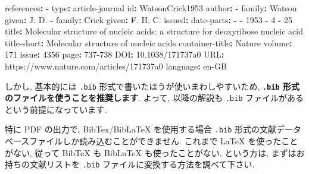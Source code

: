 \documentclass[
]{bxjsarticle}
\newenvironment{Shaded}{\begin{snugshade}}{\end{snugshade}}
\newcommand{\AttributeTok}[1]{\textcolor[rgb]{0.77,0.63,0.00}{#1}}
\newcommand{\DecValTok}[1]{\textcolor[rgb]{0.00,0.00,0.81}{#1}}
\newcommand{\FunctionTok}[1]{\textcolor[rgb]{0.00,0.00,0.00}{#1}}
\newcommand{\KeywordTok}[1]{\textcolor[rgb]{0.13,0.29,0.53}{\textbf{#1}}}
\newcommand{\StringTok}[1]{\textcolor[rgb]{0.31,0.60,0.02}{#1}}
\begin{document}
\begin{Shaded}
\begin{Highlighting}[numbers=left,,]
\FunctionTok{references}\KeywordTok{:}
\AttributeTok{  }\KeywordTok{{-}}\AttributeTok{ }\FunctionTok{type}\KeywordTok{:}\AttributeTok{ article{-}journal}
\AttributeTok{    }\FunctionTok{id}\KeywordTok{:}\AttributeTok{ WatsonCrick1953}
\AttributeTok{    }\FunctionTok{author}\KeywordTok{:}
\AttributeTok{    }\KeywordTok{{-}}\AttributeTok{ }\FunctionTok{family}\KeywordTok{:}\AttributeTok{ Watson}
\AttributeTok{      }\FunctionTok{given}\KeywordTok{:}\AttributeTok{ J. D.}
\AttributeTok{    }\KeywordTok{{-}}\AttributeTok{ }\FunctionTok{family}\KeywordTok{:}\AttributeTok{ Crick}
\AttributeTok{      }\FunctionTok{given}\KeywordTok{:}\AttributeTok{ F. H. C.}
\AttributeTok{    }\FunctionTok{issued}\KeywordTok{:}
\AttributeTok{      }\FunctionTok{date{-}parts}\KeywordTok{:}
\AttributeTok{      }\KeywordTok{{-}}\AttributeTok{ }\KeywordTok{{-}}\AttributeTok{ }\DecValTok{1953}
\AttributeTok{        }\KeywordTok{{-}}\AttributeTok{ }\DecValTok{4}
\AttributeTok{        }\KeywordTok{{-}}\AttributeTok{ }\DecValTok{25}
\AttributeTok{    }\FunctionTok{title}\KeywordTok{:}\AttributeTok{ }\StringTok{\textquotesingle{}Molecular structure of nucleic acids: a structure for}
\StringTok{      deoxyribose nucleic acid\textquotesingle{}}
\AttributeTok{    }\FunctionTok{title{-}short}\KeywordTok{:}\AttributeTok{ Molecular structure of nucleic acids}
\AttributeTok{    }\FunctionTok{container{-}title}\KeywordTok{:}\AttributeTok{ Nature}
\AttributeTok{    }\FunctionTok{volume}\KeywordTok{:}\AttributeTok{ }\DecValTok{171}
\AttributeTok{    }\FunctionTok{issue}\KeywordTok{:}\AttributeTok{ }\DecValTok{4356}
\AttributeTok{    }\FunctionTok{page}\KeywordTok{:}\AttributeTok{ 737{-}738}
\AttributeTok{    }\FunctionTok{DOI}\KeywordTok{:}\AttributeTok{ 10.1038/171737a0}
\AttributeTok{    }\FunctionTok{URL}\KeywordTok{:}\AttributeTok{ https://www.nature.com/articles/171737a0}
\AttributeTok{    }\FunctionTok{language}\KeywordTok{:}\AttributeTok{ en{-}GB}
\end{Highlighting}
\end{Shaded}

しかし, 基本的には \texttt{.bib} 形式で書いたほうが使いまわしやすいため, \textbf{\texttt{.bib} 形式のファイルを使うことを推奨します}. よって, 以降の解説も \texttt{.bib} ファイルがあるという前提になっています.

特に PDF の出力で, BibTex/BibLaTeX を使用する場合 \texttt{.bib} 形式の文献データベースファイルしか読み込むことができません. これまで LaTeX を使ったことがない, 従って BibTeX も BibLaTeX も使ったことがない, という方は, まずはお持ちの文献リストを \texttt{.bib} ファイルに変換する方法を調べて下さい.
\end{document}
